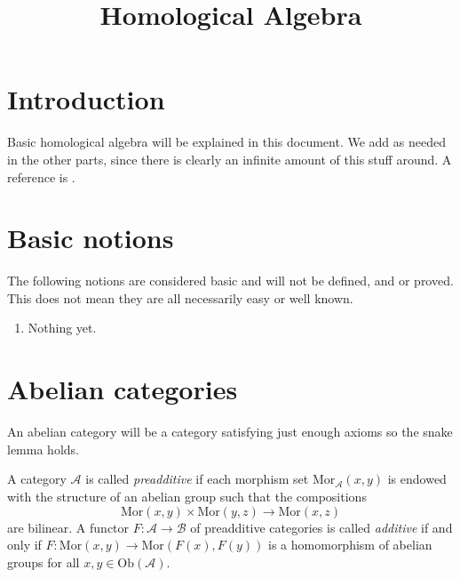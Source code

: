 

%


\title{Homological Algebra}


\maketitle

\tableofcontents

\section{Introduction}
\label{section-introduction}

\noindent
Basic homological algebra will be explained in this document.
We add as needed in the other parts, since there is clearly
an infinite amount of this stuff around.
A reference is \cite{Maclane}.

\section{Basic notions}
\label{section-topology-basic}

\noindent
The following notions are considered basic and will not be defined,
and or proved. This does not mean they are all necessarily easy or
well known.

\begin{enumerate}
\item Nothing yet.
\end{enumerate}


\section{Abelian categories}
\label{section-abelian-categories}

\noindent
An abelian category will be a category satisfying
just enough axioms so the snake lemma holds.

\begin{definition}
\label{definition-preadditive}
A category $\mathcal{A}$ is called {\it preadditive} if each
morphism set $\text{Mor}_{\mathcal{A}}(x, y)$ is endowed
with the structure of an abelian group such that the
compositions
$$
\text{Mor}(x, y) \times \text{Mor}(y, z)
\longrightarrow
\text{Mor}(x, z)
$$
are bilinear. A functor $F : \mathcal{A} \to \mathcal{B}$ of
preadditive categories is called {\it additive} if and only
if $F : \text{Mor}(x, y) \to \text{Mor}(F(x), F(y))$
is a homomorphism of abelian groups for all
$x, y \in \text{Ob}(\mathcal{A})$.
\end{definition}

